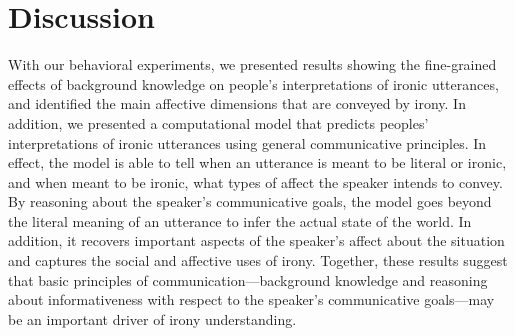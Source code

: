 \documentclass[10pt,letterpaper]{article}
\begin{document}
\begin{figure}[t]
\end{figure}

\section{Discussion}

With our behavioral experiments, we presented results showing the fine-grained effects of background knowledge on people's interpretations of ironic utterances, and identified the main affective dimensions that are conveyed by irony. In addition, we presented a computational model that predicts peoples' interpretations of ironic utterances using general communicative principles. In effect, the model is able to tell when an utterance is meant to be literal or ironic, and when meant to be ironic, what types of affect the speaker intends to convey. By reasoning about the speaker's communicative goals, the model goes beyond the literal meaning of an utterance to infer the actual state of the world. In addition, it recovers important aspects of the speaker's affect about the situation and captures the social and affective uses of irony. Together, these results suggest that basic principles of communication---background knowledge and reasoning about informativeness with respect to the speaker's communicative goals---may be an important driver of irony understanding.
\end{document}
